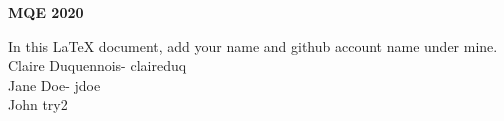 \documentclass[a4paper, 10pt]{article}
\begin{document}
\begin{center}\bfseries\Huge MQE 2020 \end{center}

\vspace{10mm} %
In this LaTeX document, add your name and github account name under mine.\\

\vspace{10mm} %
\noindent Claire Duquennois- claireduq\\
Jane Doe- jdoe\\
John try2\\
\end{document}
